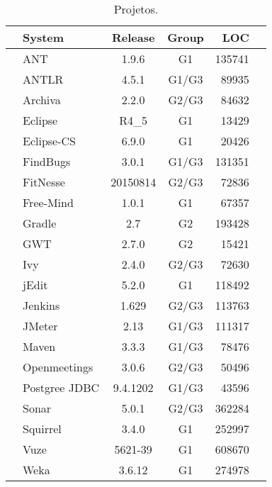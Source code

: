 
  
\begin{table}[p]\footnotesize
\centering
	\caption{Projetos.}
	\begin{tabular}{l|lccrr}\hline
		 & \textbf{System} & \textbf{Release} & \textbf{Group}  & \textbf{LOC} \\\hline \hline
		\multirow{22}{*}{\rotatebox[origin=c]{90}{\textbf{Application}}} 
																 & ANT & 1.9.6 & G1 & 135741\\
																 & ANTLR  & 4.5.1 & G1/G3 & 89935 \\
																 & Archiva  & 2.2.0 & G2/G3 & 84632\\
																 & Eclipse & R4\_5 & G1 & 13429\\
																 & Eclipse-CS & 6.9.0 & G1 & 20426\\
																 & FindBugs & 3.0.1 & G1/G3 & 131351\\
																 & FitNesse & 20150814 & G2/G3 & 72836\\
																 & Free-Mind & 1.0.1 & G1 & 67357\\
																 & Gradle & 2.7 & G2 & 193428\\
																 & GWT & 2.7.0 & G2 & 15421\\
																 & Ivy & 2.4.0 & G2/G3 & 72630\\
																 & jEdit & 5.2.0 & G1 & 118492\\
						   									     & Jenkins & 1.629 & G2/G3 & 113763\\
																 & JMeter & 2.13 & G1/G3 & 111317\\
																 & Maven & 3.3.3 & G1/G3 & 78476\\
																 & Openmeetings & 3.0.6 & G2/G3 & 50496\\
																 & Postgree JDBC & 9.4.1202 & G1/G3 & 43596\\ 
																 & Sonar & 5.0.1 & G2/G3 & 362284\\
																 & Squirrel & 3.4.0 & G1 & 252997\\
																 & Vuze & 5621-39 & G1 & 608670\\
																 & Weka & 3.6.12 & G1 & 274978\\
																 \hline
					

\end{tabular}
\end{table}
